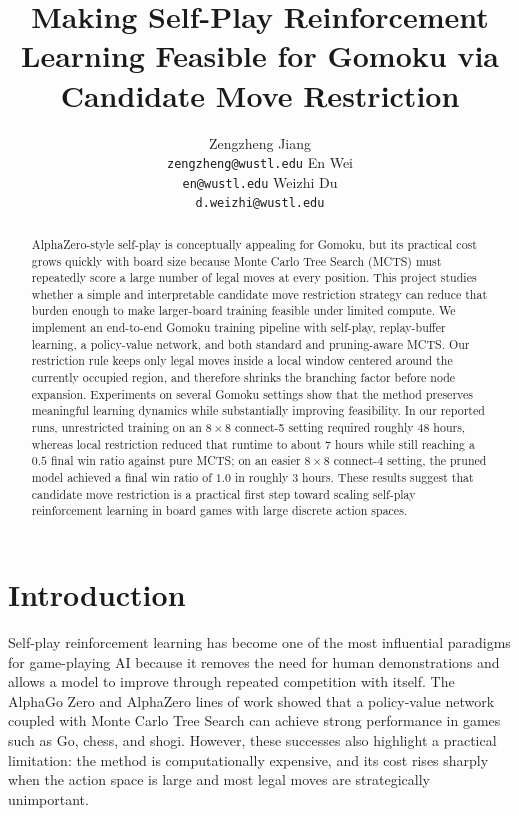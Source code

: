 \documentclass{article}
\title{Making Self-Play Reinforcement Learning Feasible for Gomoku via Candidate Move Restriction}
\author{%
  Zengzheng Jiang \\
  \texttt{zengzheng@wustl.edu}
  \And
  En Wei \\
  \texttt{en@wustl.edu}
  \And
  Weizhi Du \\
  \texttt{d.weizhi@wustl.edu}
}
\begin{document}
\maketitle

\begin{abstract}
  AlphaZero-style self-play is conceptually appealing for Gomoku, but its practical cost grows quickly with board size because Monte Carlo Tree Search (MCTS) must repeatedly score a large number of legal moves at every position. This project studies whether a simple and interpretable candidate move restriction strategy can reduce that burden enough to make larger-board training feasible under limited compute. We implement an end-to-end Gomoku training pipeline with self-play, replay-buffer learning, a policy-value network, and both standard and pruning-aware MCTS. Our restriction rule keeps only legal moves inside a local window centered around the currently occupied region, and therefore shrinks the branching factor before node expansion. Experiments on several Gomoku settings show that the method preserves meaningful learning dynamics while substantially improving feasibility. In our reported runs, unrestricted training on an \(8 \times 8\) connect-5 setting required roughly 48 hours, whereas local restriction reduced that runtime to about 7 hours while still reaching a \(0.5\) final win ratio against pure MCTS; on an easier \(8 \times 8\) connect-4 setting, the pruned model achieved a final win ratio of \(1.0\) in roughly 3 hours. These results suggest that candidate move restriction is a practical first step toward scaling self-play reinforcement learning in board games with large discrete action spaces.
\end{abstract}

\section{Introduction}

Self-play reinforcement learning has become one of the most influential paradigms for game-playing AI because it removes the need for human demonstrations and allows a model to improve through repeated competition with itself. The AlphaGo Zero and AlphaZero lines of work showed that a policy-value network coupled with Monte Carlo Tree Search can achieve strong performance in games such as Go, chess, and shogi. However, these successes also highlight a practical limitation: the method is computationally expensive, and its cost rises sharply when the action space is large and most legal moves are strategically unimportant.
\end{document}
